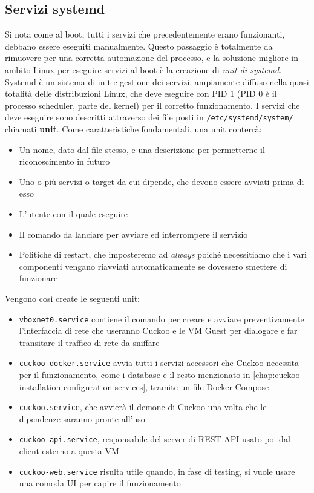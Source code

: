 \subsection{Servizi systemd}
Si nota come al boot, tutti i servizi che precedentemente erano funzionanti, debbano essere eseguiti manualmente. Questo passaggio è totalmente da rimuovere per una corretta automazione del processo, e la soluzione migliore in ambito Linux per eseguire servizi al boot è la creazione di \emph{unit di systemd}. Systemd è un sistema di init e gestione dei servizi, ampiamente diffuso nella quasi totalità delle distribuzioni Linux, che deve eseguire con PID 1 (PID 0 è il processo scheduler, parte del kernel) per il corretto funzionamento. I servizi che deve eseguire sono descritti attraverso dei file posti in \texttt{/etc/systemd/system/} chiamati \textbf{unit}.
Come caratteristiche fondamentali, una unit conterrà:
\begin{itemize}
    \item Un nome, dato dal file stesso, e una descrizione per permetterne il riconoscimento in futuro
    \item Uno o più servizi o target da cui dipende, che devono essere avviati prima di esso
    \item L'utente con il quale eseguire
    \item Il comando da lanciare per avviare ed interrompere il servizio
    \item Politiche di restart, che imposteremo ad \emph{always}
    poiché necessitiamo che i vari componenti vengano riavviati automaticamente se dovessero smettere di funzionare
\end{itemize}

Vengono così create le seguenti unit:
\begin{itemize}
    \item \texttt{vboxnet0.service} contiene il comando per creare e avviare preventivamente l'interfaccia di rete
    che useranno Cuckoo e le VM Guest per dialogare e far transitare il traffico di rete da sniffare
    \item \texttt{cuckoo-docker.service} avvia tutti i servizi accessori che Cuckoo
    necessita per il funzionamento, come i database e il resto menzionato in \ref{chap:cuckoo-installation-configuration-services},
    tramite un file Docker Compose
    \item \texttt{cuckoo.service}, che avvierà il demone di Cuckoo una volta che le dipendenze saranno pronte all'uso
    \item \texttt{cuckoo-api.service}, responsabile del server di REST API usato poi dal client esterno a questa VM
    \item \texttt{cuckoo-web.service} risulta utile quando, in fase di testing, si vuole usare una comoda UI per capire il funzionamento
\end{itemize}

